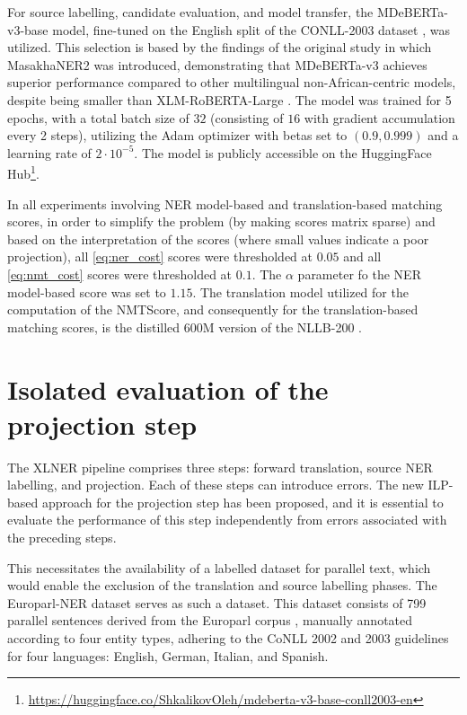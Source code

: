 For source labelling, candidate evaluation, and model transfer, the MDeBERTa-v3-base \cite{He2021DeBERTaV3ID}
model, fine-tuned on the English split of the CONLL-2003 dataset \cite{tjong-kim-sang-de-meulder-2003-introduction-conll},
was utilized. This selection is based by the findings of the original study in which
MasakhaNER2 was introduced, demonstrating that MDeBERTa-v3 achieves superior performance
compared to other multilingual non-African-centric models, despite being smaller than
XLM-RoBERTA-Large \cite{conneau-etal-2020-unsupervised-xlmr}. The model was trained
for 5 epochs, with a total batch size of \( 32 \) (consisting of \( 16 \) with gradient
accumulation every 2 steps), utilizing the Adam optimizer \cite{Kingma2014AdamAM} with
betas set to \( (0.9,0.999) \) and a learning rate of \( 2 \cdot 10^{-5} \). The model
is publicly accessible on the HuggingFace Hub\footnote{\url{https://huggingface.co/ShkalikovOleh/mdeberta-v3-base-conll2003-en}}.

In all experiments involving NER model-based and translation-based matching scores,
in order to simplify the problem (by making scores matrix sparse) and based on the interpretation of the scores
(where small values indicate a poor projection), all \eqref{eq:ner_cost} scores were
thresholded at \( 0.05 \) and all \eqref{eq:nmt_cost} scores were thresholded
at \( 0.1 \). The \( \alpha \) parameter fo the NER model-based score was set to \( 1.15 \).
The translation model utilized for the computation of the NMTScore, and consequently
for the translation-based matching scores, is the distilled 600M version of the NLLB-200 \cite{nllbteam2022languageleftbehindscaling}.

\section{Isolated evaluation of the projection step}
The XLNER pipeline comprises three steps: forward translation, source NER labelling,
and projection. Each of these steps can introduce errors. The new ILP-based approach for the
projection step has been proposed, and it is essential to evaluate the performance
of this step independently from errors associated with the preceding steps.

This necessitates the availability of a labelled dataset for parallel text,
which would enable the exclusion of the translation and source labelling phases.
The Europarl-NER dataset \cite{agerri-etal-2018-building} serves as such a dataset.
This dataset consists of 799 parallel sentences derived from the Europarl corpus \cite{koehn2005europarl}, manually annotated according to four entity types, adhering to the CoNLL 2002 and 2003 guidelines for four languages: English, German, Italian, and Spanish.

